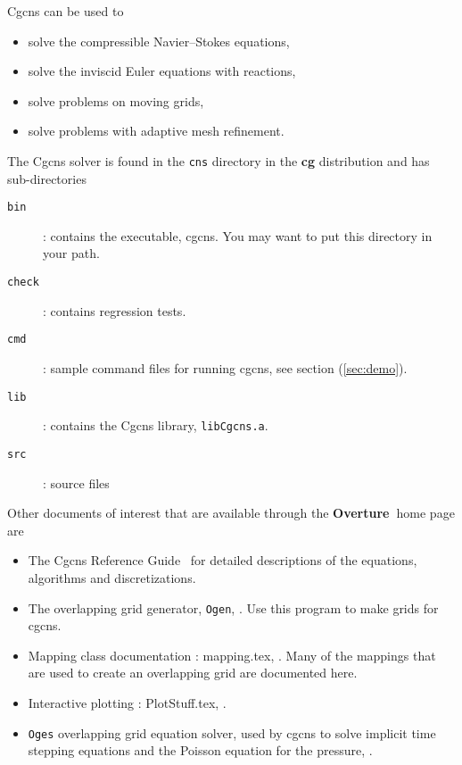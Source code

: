 \documentclass{article}
\newcommand{\Overture}{{\bf Overture\ }}
\begin{document}
Cgcns can be used to 
\begin{itemize}
  \item solve the compressible Navier--Stokes equations,
  \item solve the inviscid Euler equations with reactions, 
  \item solve problems on moving grids, 
  \item solve problems with adaptive mesh refinement.
\end{itemize} 

The Cgcns solver is found in the {\tt cns} directory in the {\bf cg} distribution and has
sub-directories
\begin{description}
 \item[{\tt bin}] : contains the executable, cgcns. You may want to put this directory in your path.
 \item[{\tt check}] : contains regression tests.
 \item[{\tt cmd}] : sample command files for running cgcns, see section (\ref{sec:demo}).
 \item[{\tt lib}] : contains the Cgcns library, {\tt libCgcns.a}.
 \item[{\tt src}] : source files 
\end{description}


\noindent
Other documents of interest that are available through the \Overture home page are
\begin{itemize}
\item The Cgcns Reference Guide~\cite{CgcnsReferenceManual} for detailed descriptions of the
      equations, algorithms and discretizations.
\item The overlapping grid generator, {\tt Ogen}, \cite{OGEN}. Use this program to make grids for cgcns.
\item Mapping class documentation : {\ff mapping.tex}, \cite{MAPPINGS}. Many of the mappings that
   are used to create an overlapping grid are documented here. 
\item Interactive plotting : {\ff PlotStuff.tex}, \cite{PLOTSTUFF}.
\item {\tt Oges} overlapping grid equation solver, used by cgcns to solve implicit time stepping
    equations and the Poisson equation for the pressure, \cite{OGES}.
\end{itemize}
\end{document}
